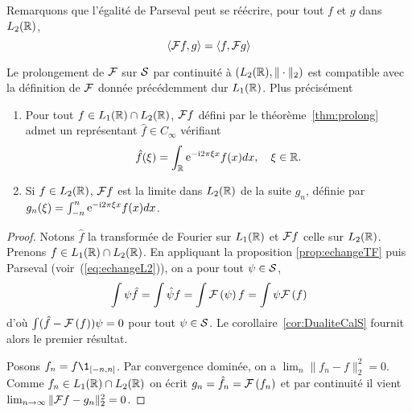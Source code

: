 Remarquons que l'{\'e}galit{\'e} de Parseval peut se r{\'e}{\'e}crire, pour tout $f$ et $g$ dans $L_2(\mathbb{R})$,
\begin{equation}\label{eq:echangeL2}
\left\langle  \mathcal{F} f, g \right\rangle = \left\langle f, \mathcal{F} g \right\rangle
\end{equation}

\begin{proposition}
\label{prop:prolongementL1L2}
Le prolongement de $\mathcal{F}$ sur $\mathcal{S}$ par continuit{\'e} {\`a} $(L_2(\mathbb{R}),\|\cdot\|_2)$ est compatible avec la d{\'e}finition de
$\mathcal{F}$ donn{\'e}e pr{\'e}c{\'e}demment dur $L_1(\mathbb{R})$. Plus pr{\'e}cis{\'e}ment
\begin{enumerate}
\item Pour tout $f\in L_1(\mathbb{R}) \cap L_2(\mathbb{R})$, $\mathcal{F} f$ d{\'e}fini par le th{\'e}or{\`e}me~\ref{thm:prolong} admet un repr{\'e}sentant
 $\hat{f}\in C_\infty$ v{\'e}rifiant
$$
\hat{f}(\xi) = \int_{\mathbb{R}} \mathrm{e}^{- \mathrm{i} 2 \pi \xi x} f(x) dx,\quad\xi\in\mathbb{R}.
$$
\item Si $f \in L_2(\mathbb{R})$, $\mathcal{F} f$ est la limite dans $L_2(\mathbb{R})$ de la suite $g_n$, d{\'e}finie par $g_n(\xi) =
  \int_{-n}^n \mathrm{e}^{- \mathrm{i} 2 \pi \xi x} f(x) dx$.
\end{enumerate}
\end{proposition}
\begin{proof}
Notons $\hat{f}$ la transform{\'e}e de Fourier sur $L_1(\mathbb{R})$ et $\mathcal{F} f$ celle sur $L_2(\mathbb{R})$.
Prenons $f \in L_1(\mathbb{R}) \cap L_2(\mathbb{R})$. En appliquant la proposition \ref{prop:echangeTF} puis
Parseval (voir~(\ref{eq:echangeL2})), on a pour tout $\psi \in \mathcal{S}$,
$$
\int \psi \hat{f} = \int \hat{\psi} f = \int \mathcal{F}\left( \psi \right) f= \int \psi \mathcal{F}\left( f \right)
$$
d'o{\`u} $\int  (\hat{f} - \mathcal{F}\left( f \right)) \psi  = 0$ pour tout $\psi \in \mathcal{S}$. Le corollaire~\ref{cor:DualiteCalS} fournit alors le
premier r{\'e}sultat.

Posons $f_n = f \1_{[-n,n]}$. Par convergence domin{\'e}e, on a $\lim_n \| f_n - f \|_2^2= 0$.
Comme $f_n  \in L_1(\mathbb{R}) \cap L_2(\mathbb{R})$ on {\'e}crit $g_n = \hat{f}_n = \mathcal{F}\left( f_n \right)$ et par continuit{\'e} il vient
$ \lim_{n \to \infty} \| \mathcal{F} f - g_n \|_2^2= 0$.
\end{proof}

